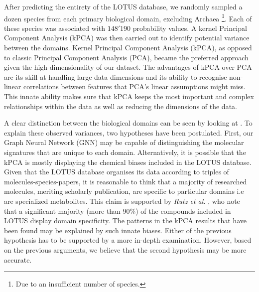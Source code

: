 \documentclass[
11pt, %
oneside, %
english, %
singlespacing, %
headsepline, %
chapterinoneline, %
]{MastersDoctoralThesis} %
\begin{document}
After predicting the entirety of the LOTUS database, we randomly sampled a dozen species from each primary biological domain, excluding Archaea \footnote{Due to an insufficient number of species.}. Each of these species was associated with $148'190$ probability values. A kernel Principal Component Analysis (kPCA) was then carried out to identify potential variance between the domains. Kernel Principal Component Analysis (kPCA), as opposed to classic Principal Component Analysis (PCA), became the preferred approach given the high-dimensionality of our dataset. The advantages of kPCA over PCA are its skill at handling large data dimensions and its ability to recognise non-linear correlations between features that PCA's linear assumptions might miss. This innate ability makes sure that kPCA keeps the most important and complex relationships within the data as well as reducing the dimensions of the data.

A clear distinction between the biological domains can be seen by looking at . To explain these observed variances, two hypotheses have been postulated. First, our  Graph Neural Network (GNN) may be capable of distinguishing the molecular signatures that are unique to each domain. Alternatively, it is possible that the kPCA is mostly displaying the chemical biases included in the LOTUS database. Given that the LOTUS database organises its data according to triples of molecules-species-papers, it is reasonable to think that a majority of  researched molecules, meriting scholarly publication, are specific to particular domains i.e are specialized metabolites. This claim is supported by \textit{Rutz et al.} \cite{rutzLOTUSInitiativeOpen2022}, who note that a significant majority (more than 90\%) of the compounds included in LOTUS display domain specificity. The patterns in the kPCA results that have been found may be explained by such innate biases. Either of the previous hypothesis has to be supported by a more in-depth examination. However, based on the previous arguments, we believe that the second hypothesis may be more accurate.
 
\end{document}
